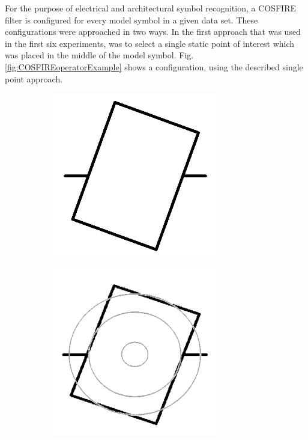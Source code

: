 For the purpose of electrical and architectural symbol recognition, a COSFIRE filter is configured for every model symbol in a given data set. These configurations were approached in two ways. In the first approach that was used in the first six experiments, was to select a single static point of interest which was placed in the middle of the model symbol. Fig. \ref{fig:COSFIREoperatorExample} shows a configuration, using the described single point approach.
%
\begin{figure}[h]
        \centering
        \begin{subfigure}[b]{0.3\textwidth}
                \centering
                \includegraphics[width=0.8\textwidth]{figures/Method/ModelSymbol1.png}
                \caption{}
                \label{fig:modelsymbol}
        \end{subfigure}
        \begin{subfigure}[b]{0.3\textwidth}
                \centering
                \includegraphics[width=0.8\textwidth]{figures/Method/ModelRhoConfiguration.png}

\end{subfigure}
\end{figure}
